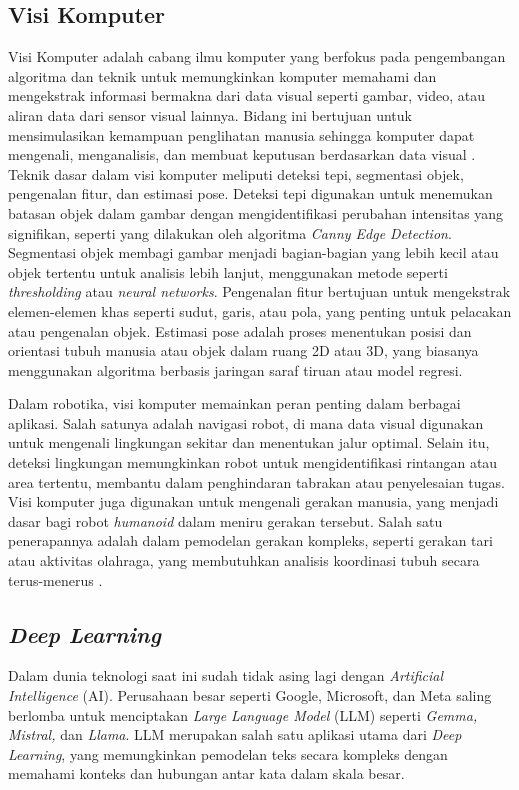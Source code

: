 \subsection{Visi Komputer}
Visi Komputer adalah cabang ilmu komputer yang berfokus pada pengembangan algoritma dan teknik untuk memungkinkan komputer memahami dan mengekstrak informasi bermakna dari data visual seperti gambar, video, atau aliran data dari sensor visual lainnya. Bidang ini bertujuan untuk mensimulasikan kemampuan penglihatan manusia sehingga komputer dapat mengenali, menganalisis, dan membuat keputusan berdasarkan data visual . Teknik dasar dalam visi komputer meliputi deteksi tepi, segmentasi objek, pengenalan fitur, dan estimasi pose. Deteksi tepi digunakan untuk menemukan batasan objek dalam gambar dengan mengidentifikasi perubahan intensitas yang signifikan, seperti yang dilakukan oleh algoritma \textit{Canny Edge Detection}. Segmentasi objek membagi gambar menjadi bagian-bagian yang lebih kecil atau objek tertentu untuk analisis lebih lanjut, menggunakan metode seperti \textit{thresholding} atau \textit{neural networks}. Pengenalan fitur bertujuan untuk mengekstrak elemen-elemen khas seperti sudut, garis, atau pola, yang penting untuk pelacakan atau pengenalan objek. Estimasi pose adalah proses menentukan posisi dan orientasi tubuh manusia atau objek dalam ruang 2D atau 3D, yang biasanya menggunakan algoritma berbasis jaringan saraf tiruan atau model regresi.


Dalam robotika, visi komputer memainkan peran penting dalam berbagai aplikasi. Salah satunya adalah navigasi robot, di mana data visual digunakan untuk mengenali lingkungan sekitar dan menentukan jalur optimal. Selain itu, deteksi lingkungan memungkinkan robot untuk mengidentifikasi rintangan atau area tertentu, membantu dalam penghindaran tabrakan atau penyelesaian tugas. Visi komputer juga digunakan untuk mengenali gerakan manusia, yang menjadi dasar bagi robot \textit{humanoid} dalam meniru gerakan tersebut. Salah satu penerapannya adalah dalam pemodelan gerakan kompleks, seperti gerakan tari atau aktivitas olahraga, yang membutuhkan analisis koordinasi tubuh secara terus-menerus .


\subsection{\textit{Deep Learning}}
Dalam dunia teknologi saat ini sudah tidak asing lagi dengan \textit{Artificial Intelligence} (AI). Perusahaan besar seperti Google, Microsoft, dan Meta saling berlomba untuk menciptakan \textit{Large Language Model} (LLM) seperti \textit{Gemma, Mistral,} dan \textit{Llama}. LLM merupakan salah satu aplikasi utama dari \textit{Deep Learning}, yang memungkinkan pemodelan teks secara kompleks dengan memahami konteks dan hubungan antar kata dalam skala besar.

